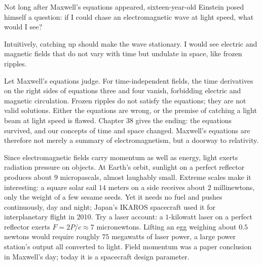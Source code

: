 \begin{thought}
Not long after Maxwell's equations appeared, sixteen-year-old Einstein posed himself a question: if I could chase an electromagnetic wave at light speed, what would I see?

Intuitively, catching up should make the wave stationary. I would see electric and magnetic fields that do not vary with time but undulate in space, like frozen ripples.

Let Maxwell's equations judge. For time-independent fields, the time derivatives on the right sides of equations three and four vanish, forbidding electric and magnetic circulation. Frozen ripples do not satisfy the equations; they are not valid solutions. Either the equations are wrong, or the premise of catching a light beam at light speed is flawed. Chapter 38 gives the ending: the equations survived, and our concepts of time and space changed. Maxwell's equations are therefore not merely a summary of electromagnetism, but a doorway to relativity.
\end{thought}

Since electromagnetic fields carry momentum as well as energy, light exerts radiation pressure on objects. At Earth's orbit, sunlight on a perfect reflector produces about \(9\) micropascals, almost laughably small. Extreme scales make it interesting: a square solar sail \(14\) meters on a side receives about \(2\) millinewtons, only the weight of a few sesame seeds. Yet it needs no fuel and pushes continuously, day and night; Japan's IKAROS spacecraft used it for interplanetary flight in 2010. Try a laser account: a \(1\)-kilowatt laser on a perfect reflector exerts \(F=2P/c\approx7\) micronewtons. Lifting an egg weighing about \(0.5\) newtons would require roughly \(75\) megawatts of laser power, a large power station's output all converted to light. Field momentum was a paper conclusion in Maxwell's day; today it is a spacecraft design parameter.

